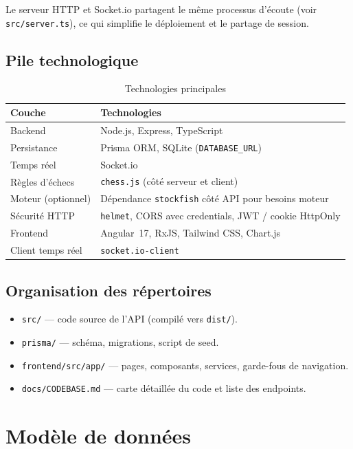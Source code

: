 \documentclass[11pt,a4paper]{report}
\begin{document}
Le serveur HTTP et Socket.io partagent le même processus d'écoute (voir \texttt{src/server.ts}), ce qui simplifie le déploiement et le partage de session.

\section{Pile technologique}

\begin{table}[h]
  \centering
  \caption{Technologies principales}
  \begin{tabular}{@{}ll@{}}
    \toprule
    Couche & Technologies \\
    \midrule
    Backend & Node.js, Express, TypeScript \\
    Persistance & Prisma ORM, SQLite (\texttt{DATABASE\_URL}) \\
    Temps réel & Socket.io \\
    Règles d'échecs & \texttt{chess.js} (côté serveur et client) \\
    Moteur (optionnel) & Dépendance \texttt{stockfish} côté API pour besoins moteur \\
    Sécurité HTTP & \texttt{helmet}, CORS avec credentials, JWT / cookie HttpOnly \\
    Frontend & Angular~17, RxJS, Tailwind CSS, Chart.js \\
    Client temps réel & \texttt{socket.io-client} \\
    \bottomrule
  \end{tabular}
\end{table}

\section{Organisation des répertoires}

\begin{itemize}[leftmargin=*]
  \item \texttt{src/} — code source de l'API (compilé vers \texttt{dist/}).
  \item \texttt{prisma/} — schéma, migrations, script de seed.
  \item \texttt{frontend/src/app/} — pages, composants, services, garde-fous de navigation.
  \item \texttt{docs/CODEBASE.md} — carte détaillée du code et liste des endpoints.
\end{itemize}

\chapter{Modèle de données}
\end{document}
